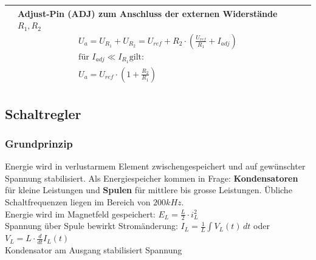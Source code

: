 \begin{longtable}{|l|l|l|}
\begin{minipage}{6cm}
		\end{minipage}
	&
		\begin{minipage}{8cm}
			Adjust-Pin (ADJ) zum Anschluss der externen Widerstände $R_1,R_2$
			\begin{gather*}
				U_a = U_{R_1} + U_{R_2} = U_{ref} + R_2 \cdot 
				\left(\frac{U_{ref}}{R_1} + I_{adj}\right) \\
				\text{für }I_{adj} \ll I_{R_1} \text{gilt:} \\
				U_a = U_{ref} \cdot \left(1+\frac{R_2}{R_1}\right)
			\end{gather*}
		\end{minipage}
	\\ \hline
\end{longtable}

\subsection{Schaltregler}
	\subsubsection{Grundprinzip}
		Energie wird in verlustarmem Element zwischengespeichert und auf gewünschter
		Spannung stabilisiert. Als Energiespeicher kommen in Frage: \textbf{Kondensatoren}
		für kleine Leistungen und \textbf{Spulen} für mittlere bis grosse Leistungen.
		Übliche Schaltfrequenzen liegen im Bereich von $200kHz$. \\
		
		Energie wird im Magnetfeld gespeichert: $E_L = \frac{L}{2} \cdot i_L^2$ \\
		Spannung über Spule bewirkt Stromänderung: $I_L = \frac{1}{L} \int V_L(t) \, dt$ 
		oder $V_L = L \cdot \frac{d}{dt} I_L(t)$\\
		Kondensator am Ausgang stabilisiert Spannung \\
		
